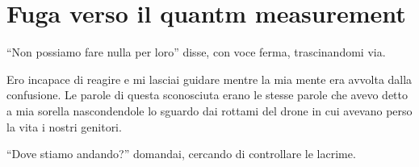 \section{Fuga verso il quantm measurement}
\begin{center}
\begin{minipage}{0.7\textwidth}
    \centering
\end{minipage}
\end{center}

\begin{dialogue}
 \enquote{Non possiamo fare nulla per loro} disse,  con voce ferma, trascinandomi via.
\end{dialogue}
  Ero incapace di reagire e mi lasciai guidare mentre  la mia mente era avvolta dalla confusione. Le parole di questa sconosciuta erano le stesse parole che avevo detto a mia sorella nascondendole lo sguardo dai rottami del drone in cui avevano perso la vita i nostri genitori.
\begin{dialogue}
 ``Dove stiamo andando?'' domandai, cercando di controllare le lacrime.
\end{dialogue}
 
